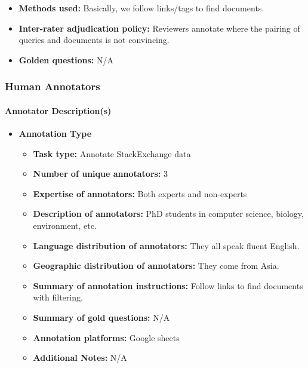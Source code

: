 \begin{itemize}
\begin{itemize}
\begin{itemize}
\begin{itemize}
                \end{itemize}
            \end{itemize}
        \end{itemize}
    \item \textbf{Methods used:} Basically, we follow links/tags to find documents.
    \item \textbf{Inter-rater adjudication policy:} Reviewers annotate where the pairing of queries and documents is not convincing.
    \item \textbf{Golden questions:} N/A
\end{itemize}

\subsubsection{Human Annotators}
\paragraph{Annotator Description(s)}
\begin{itemize}
    \item \textbf{Annotation Type}
    \begin{itemize}
        \item \textbf{Task type:} Annotate StackExchange data
        \item \textbf{Number of unique annotators:} 3
        \item \textbf{Expertise of annotators:} Both experts and non-experts
        \item \textbf{Description of annotators:} PhD students in computer science, biology, environment, etc.
        \item \textbf{Language distribution of annotators:} They all speak fluent English.
        \item \textbf{Geographic distribution of annotators:} They come from Asia.
        \item \textbf{Summary of annotation instructions:} Follow links to find documents with filtering.
        \item \textbf{Summary of gold questions:} N/A
        \item \textbf{Annotation platforms:} Google sheets
        \item \textbf{Additional Notes:} N/A
    \end{itemize}
\end{itemize}

